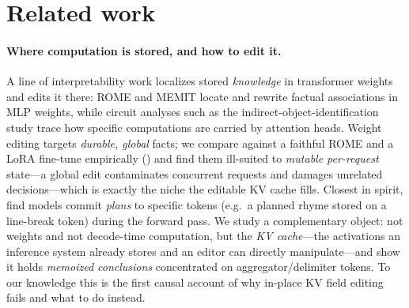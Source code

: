 \section{Related work}
\label{sec:related}

\paragraph{Where computation is stored, and how to edit it.} A line of interpretability work localizes
stored \emph{knowledge} in transformer weights and edits it there: ROME and MEMIT \citep{meng2022rome,
meng2023memit} locate and rewrite factual associations in MLP weights, while circuit analyses such as the
indirect-object-identification study \citep{wang2023ioi} trace how specific computations are carried by
attention heads. Weight editing targets \emph{durable, global} facts; we compare against a faithful ROME
and a LoRA fine-tune empirically () and find them ill-suited to \emph{mutable per-request}
state---a global edit contaminates concurrent requests and damages unrelated decisions---which is exactly
the niche the editable KV cache fills. Closest in spirit, \citet{lindsey2025biology} find models commit \emph{plans} to
specific tokens (e.g.\ a planned rhyme stored on a line-break token) during the forward pass. We study a
complementary object: not weights and not decode-time computation, but the \emph{KV cache}---the
activations an inference system already stores and an editor can directly manipulate---and show it holds
\emph{memoized conclusions} concentrated on aggregator/delimiter tokens. To our knowledge this is the
first causal account of why in-place KV field editing fails and what to do instead.

